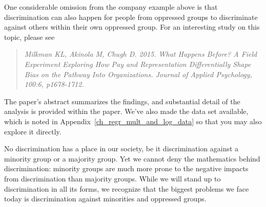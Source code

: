 One considerable omission from the company example
above is that discrimination can also happen for people
from oppressed groups to discriminate against others
within their own oppressed group.
For an interesting study on this topic, please see
\begin{quote}\em
Milkman KL, Akinola M, Chugh D. 2015.
What Happens Before?
A Field Experiment Exploring How Pay and
Representation Differentially Shape Bias
on the Pathway Into Organizations.
Journal of Applied Psychology, 100:6, p1678-1712.
\end{quote}
The paper's abstract summarizes the findings,
and substantial detail of the analysis is provided
within the paper.
We've also made the data set available,
which is noted in Appendix~\ref{ch_regr_mult_and_log_data}
so that you may also explore it directly.


No discrimination has a place in our society,
be it discrimination against a minority group
or a majority group.
Yet we cannot deny the mathematics behind
discrimination: minority groups are much more
prone to the negative impacts from discrimination
than majority groups.
While we will stand up to discrimination in all
its forms, we recognize that the biggest problems
we face today is discrimination against minorities
and oppressed groups.

